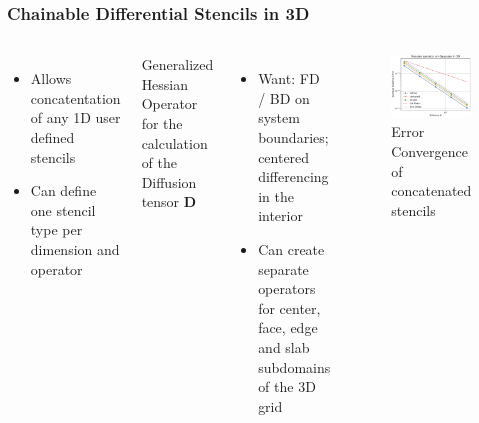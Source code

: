 \documentclass[.08pt,aspectratio=169,t]{beamer}
\begin{document}
\begin{frame}
    \frametitle{Chainable Differential Stencils in 3D}
	 \begin{columns}

\begin{itemize}[label=$\bullet$]
     \setlength{\itemsep}{3mm}
     \item Allows concatentation of any 1D user defined stencils
    \item Can define one stencil type per dimension and operator
 \end{itemize}

 \vspace{6mm}
Generalized Hessian Operator for the calculation of the Diffusion tensor $\bm{D}$
\begin{itemize}[label=$\bullet$]
     \setlength{\itemsep}{3mm}
	\item Want: FD / BD on system boundaries; centered differencing in the interior
     \item Can create separate operators for center, face, edge and slab subdomains of the 3D grid 
\end{itemize}


		 \begin{figure}
			 \includegraphics[scale=0.14]{figures/rel_error_hess.png}
			 \caption{Error Convergence of concatenated stencils} 
			 \label{fig:rel_error_hess}
		 \end{figure}
	 \end{columns}


\end{frame}
\end{document}
